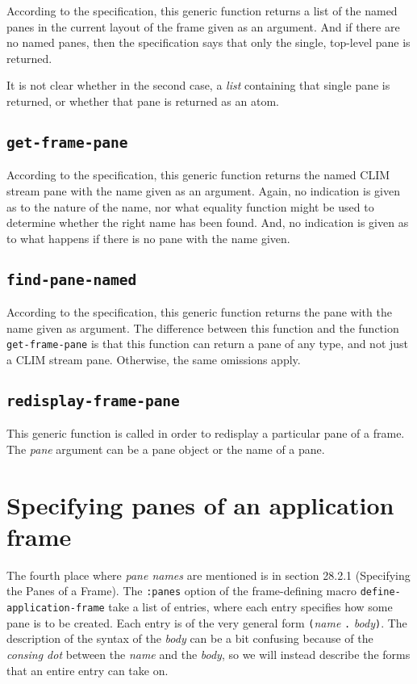 According to the specification, this generic function returns a list
of the named panes in the current layout of the frame given as an
argument.  And if there are no named panes, then the specification
says that only the single, top-level pane is returned.

It is not clear whether in the second case, a \emph{list} containing
that single pane is returned, or whether that pane is returned as an
atom.

\subsection{\texttt{get-frame-pane}}

According to the specification, this generic function returns the
named CLIM stream pane with the name given as an argument.  Again, no
indication is given as to the nature of the name, nor what equality
function might be used to determine whether the right name has been
found.  And, no indication is given as to what happens if there is no
pane with the name given.

\subsection{\texttt{find-pane-named}}

According to the specification, this generic function returns the
pane with the name given as argument.  The difference between this
function and the function \texttt{get-frame-pane} is that this
function can return a pane of any type, and not just a CLIM stream
pane.  Otherwise, the same omissions apply.

\subsection{\texttt{redisplay-frame-pane}}

This generic function is called in order to redisplay a particular
pane of a frame.  The \textit{pane} argument can be a pane object or
the name of a pane.

\section{Specifying panes of an application frame}

The fourth place where \emph{pane names} are mentioned is in section
28.2.1 (Specifying the Panes of a Frame).  The \texttt{:panes} option
of the frame-defining macro \texttt{define-application-frame} take a
list of entries, where each entry specifies how some pane is to be
created.  Each entry is of the very general form
\texttt{(}\textit{name} \texttt{.}  \textit{body}\texttt{)}.  The
description of the syntax of the \textit{body} can be a bit confusing
because of the \emph{consing dot} between the \textit{name} and the
\textit{body}, so we will instead describe the forms that an entire
entry can take on.

